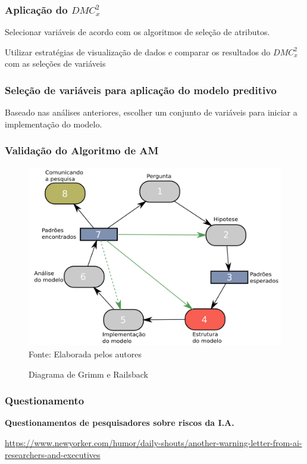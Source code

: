 \documentclass[11pt, aspectratio=169]{beamer}
\newcommand{\dmc}{\(DMC_x^2\) }
\begin{document}
\begin{frame}
  \frametitle{Aplicação do \dmc}

  Selecionar variáveis de acordo com os algoritmos de seleção de atributos.

  Utilizar estratégias de visualização de dados e comparar os resultados do \dmc com as seleções de variáveis


\end{frame}

\begin{frame}
  \frametitle{Seleção de variáveis para aplicação do modelo preditivo}

  Baseado nas análises anteriores, escolher um conjunto de variáveis para iniciar a implementação do modelo.

\end{frame}


\begin{frame}
  \frametitle{Validação do Algoritmo de AM}

  \begin{figure}[!htb]
    \centering
    \caption{Diagrama de Grimm e Railsback}
    \includegraphics[height=.6\paperheight]{../Figures/intro/Ciclo_Grimm.png}
    \\{\footnotesize Fonte: Elaborada pelos autores}
    \label{fig:fluxoGrimm}
  \end{figure}



\end{frame}

\begin{frame}
  \frametitle{Questionamento}
  \begin{center}


  \textbf{\large{Questionamentos de pesquisadores sobre riscos da I.A.}}

  \end{center}
  \leavevmode\hphantom{ }
  \begin{center}
    \url{https://www.newyorker.com/humor/daily-shouts/another-warning-letter-from-ai-researchers-and-executives}
  \end{center}

\end{frame}
\end{document}
